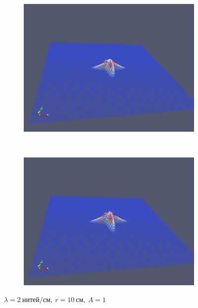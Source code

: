 \begin{figure}[H]
\begin{subfigure}[t]{0.5\textwidth}
        \includegraphics[width=\textwidth]{img/fiber/density_2_radius_10_amplitude_1/5.png}
    \end{subfigure}%
    ~
    \begin{subfigure}[t]{0.5\textwidth}
        \centering
        \includegraphics[width=\textwidth]{img/fiber/density_2_radius_10_amplitude_1/6.png}
    \end{subfigure}
    \caption{$\lambda=2~нитей/см,~r=10~см,~A=1$}
\end{figure}
